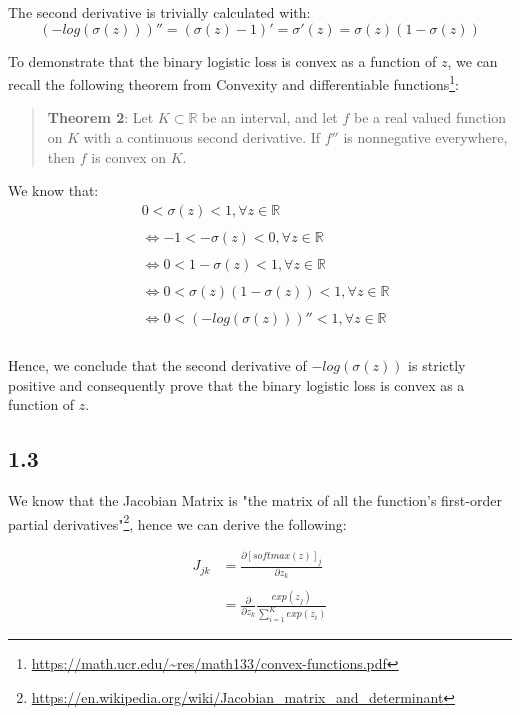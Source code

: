 \documentclass[10pt]{article}
\begin{document}
The second derivative is trivially calculated with:
$$
(-log(\sigma(z)))'' = (\sigma(z) - 1)' = \sigma'(z) = \sigma(z)(1-\sigma(z))
$$

To demonstrate that the binary logistic loss is convex as a function of $z$, we can recall the following theorem from {Convexity and differentiable functions}\footnote{\url{https://math.ucr.edu/~res/math133/convex-functions.pdf}}:

\begin{quote}
\textbf{Theorem 2}: Let $K \subset \mathbb{R}$ be an interval, and let $f$ be a real valued function on $K$ with a continuous second derivative. If $f''$ is nonnegative everywhere, then $f$ is convex on $K$.
\end{quote}

We know that:
\begin{equation}
\begin{aligned}
  {} & 0 < \sigma(z) < 1, \forall z \in \mathbb{R}
  \\ \\ &
  \Leftrightarrow -1 < -\sigma(z) < 0, \forall z \in \mathbb{R}
  \\ \\ &
  \Leftrightarrow 0 < 1 -\sigma(z) < 1, \forall z \in \mathbb{R}
  \\ \\ &
  \Leftrightarrow 0 < \sigma(z)(1 -\sigma(z)) < 1, \forall z \in \mathbb{R}
  \\ \\ &
  \Leftrightarrow 0 < (-log(\sigma(z)))'' < 1, \forall z \in \mathbb{R} \\ \\
\end{aligned}
\end{equation}

Hence, we conclude that the second derivative of $-log(\sigma(z))$ is strictly positive and consequently prove that the binary logistic loss is convex as a function of $z$.

\subsection{1.3}
We know that the Jacobian Matrix is "the matrix of all the function's first-order partial derivatives"\footnote{\url{https://en.wikipedia.org/wiki/Jacobian_matrix_and_determinant}}, hence we can derive the following:

\begin{equation}
\begin{aligned}
  J_{jk} {} & = \frac{\partial [softmax(z)]_{j}}{\partial z_{k}}
  \\ \\ &
  = \frac{\partial}{\partial z_{k}} \frac{exp(z_{j})}{\sum_{i=1}^{K} exp(z_{i})}
\end{aligned}
\end{equation}
\end{document}
